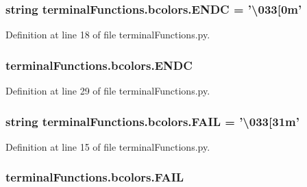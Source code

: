 \subsubsection[{E\-N\-D\-C}]{\setlength{\rightskip}{0pt plus 5cm}string terminal\-Functions.\-bcolors.\-E\-N\-D\-C = '\textbackslash{}033\mbox{[}0m'\hspace{0.3cm}{\ttfamily [static]}}\label{classterminalFunctions_1_1bcolors_a2dfd48e6d0e3f5bbe44c0103933c1af5}


Definition at line 18 of file terminal\-Functions.\-py.

\subsubsection[{E\-N\-D\-C}]{\setlength{\rightskip}{0pt plus 5cm}terminal\-Functions.\-bcolors.\-E\-N\-D\-C}\label{classterminalFunctions_1_1bcolors_a890664d0d57f3c17ff7d978ada2a7237}


Definition at line 29 of file terminal\-Functions.\-py.

\subsubsection[{F\-A\-I\-L}]{\setlength{\rightskip}{0pt plus 5cm}string terminal\-Functions.\-bcolors.\-F\-A\-I\-L = '\textbackslash{}033\mbox{[}31m'\hspace{0.3cm}{\ttfamily [static]}}\label{classterminalFunctions_1_1bcolors_a47ef6507446b1ae837c650214132a089}


Definition at line 15 of file terminal\-Functions.\-py.

\subsubsection[{F\-A\-I\-L}]{\setlength{\rightskip}{0pt plus 5cm}terminal\-Functions.\-bcolors.\-F\-A\-I\-L}\label{classterminalFunctions_1_1bcolors_a9a522043fb1ab7e81ceeb3a689a11307}


